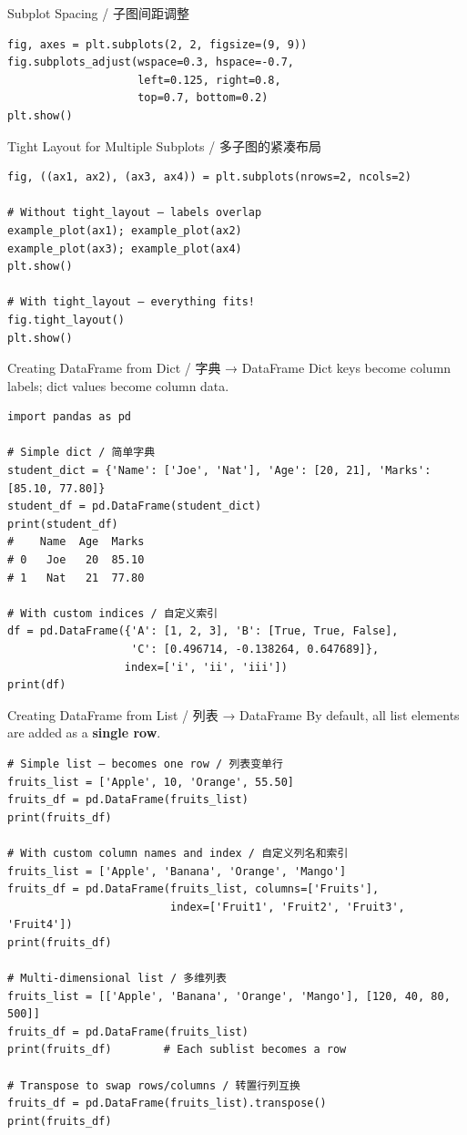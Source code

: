 \documentclass[11pt,a4paper]{report}
\begin{document}
\begin{examplebox}{Subplot Spacing / 子图间距调整}
\begin{lstlisting}
fig, axes = plt.subplots(2, 2, figsize=(9, 9))
fig.subplots_adjust(wspace=0.3, hspace=-0.7,
                    left=0.125, right=0.8,
                    top=0.7, bottom=0.2)
plt.show()
\end{lstlisting}
\end{examplebox}

\begin{examplebox}{Tight Layout for Multiple Subplots / 多子图的紧凑布局}
\begin{lstlisting}
fig, ((ax1, ax2), (ax3, ax4)) = plt.subplots(nrows=2, ncols=2)

# Without tight_layout — labels overlap
example_plot(ax1); example_plot(ax2)
example_plot(ax3); example_plot(ax4)
plt.show()

# With tight_layout — everything fits!
fig.tight_layout()
plt.show()
\end{lstlisting}
\end{examplebox}

\begin{examplebox}{Creating DataFrame from Dict / 字典 → DataFrame}
    Dict keys become column labels; dict values become column data.
\begin{lstlisting}
import pandas as pd

# Simple dict / 简单字典
student_dict = {'Name': ['Joe', 'Nat'], 'Age': [20, 21], 'Marks': [85.10, 77.80]}
student_df = pd.DataFrame(student_dict)
print(student_df)
#    Name  Age  Marks
# 0   Joe   20  85.10
# 1   Nat   21  77.80

# With custom indices / 自定义索引
df = pd.DataFrame({'A': [1, 2, 3], 'B': [True, True, False],
                   'C': [0.496714, -0.138264, 0.647689]},
                  index=['i', 'ii', 'iii'])
print(df)
\end{lstlisting}
\end{examplebox}

\begin{examplebox}{Creating DataFrame from List / 列表 → DataFrame}
    By default, all list elements are added as a \textbf{single row}.
\begin{lstlisting}
# Simple list — becomes one row / 列表变单行
fruits_list = ['Apple', 10, 'Orange', 55.50]
fruits_df = pd.DataFrame(fruits_list)
print(fruits_df)

# With custom column names and index / 自定义列名和索引
fruits_list = ['Apple', 'Banana', 'Orange', 'Mango']
fruits_df = pd.DataFrame(fruits_list, columns=['Fruits'],
                         index=['Fruit1', 'Fruit2', 'Fruit3', 'Fruit4'])
print(fruits_df)

# Multi-dimensional list / 多维列表
fruits_list = [['Apple', 'Banana', 'Orange', 'Mango'], [120, 40, 80, 500]]
fruits_df = pd.DataFrame(fruits_list)
print(fruits_df)        # Each sublist becomes a row

# Transpose to swap rows/columns / 转置行列互换
fruits_df = pd.DataFrame(fruits_list).transpose()
print(fruits_df)
\end{lstlisting}
\end{examplebox}
\end{document}

